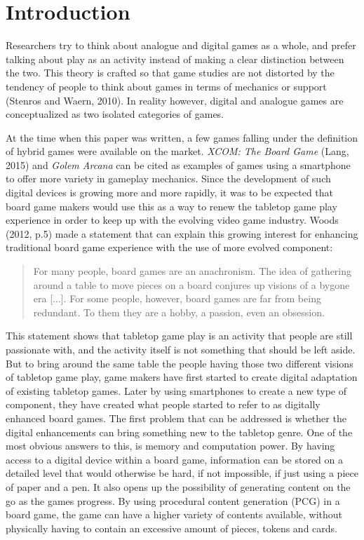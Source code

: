 \chapter{Introduction}
Researchers try to think about analogue and digital games as a whole, and prefer talking about play as an activity instead of making a clear distinction between the two. This theory is crafted so that game studies are not distorted by the tendency of people to think about games in terms of mechanics or support (Stenros and Waern, 2010)\cite{art:stenroswaern}. In reality however, digital and analogue games are conceptualized as two isolated categories of games.

At the time when this paper was written, a few games falling under the definition of hybrid games were available on the market. \textit{XCOM: The Board Game} (Lang, 2015)\cite{game:xcomtbg} and \textit{Golem Arcana} \cite{game:golem} can be cited as examples of games using a smartphone to offer more variety in gameplay mechanics. Since the development of such digital devices is growing more and more rapidly, it was to be expected that board game makers would use this as a way to renew the tabletop game play experience in order to keep up with the evolving video game industry. Woods (2012, p.5) \cite{book:euro} made a statement that can explain this growing interest for enhancing traditional board game experience with the use of more evolved component:

\begin{quotation}
For many people, board games are an anachronism. The idea of gathering around a table to move pieces on a board conjures up visions of a bygone era [...]. For some people, however, board games are far from being redundant. To them they are a hobby, a passion, even an obsession.
\end{quotation}

This statement shows that tabletop game play is an activity that people are still passionate with, and the activity itself is not something that should be left aside. But to bring around the same table the people having those two different visions of tabletop game play, game makers have first started to create digital adaptation of existing tabletop games. Later by using smartphones to create a new type of component, they have created what people started to refer to as digitally enhanced board games. The first problem that can be addressed is whether the digital enhancements can bring something new to the tabletop genre. One of the most obvious answers to this, is memory and computation power. By having access to a digital device within a board game, information can be stored on a detailed level that would otherwise be hard, if not impossible, if just using a piece of paper and a pen. 
It also opens up the possibility of generating content on the go as the games progress. By using procedural content generation (PCG) in a board game, the game can have a higher variety of contents available, without physically having to contain an excessive amount of pieces, tokens and cards. 

